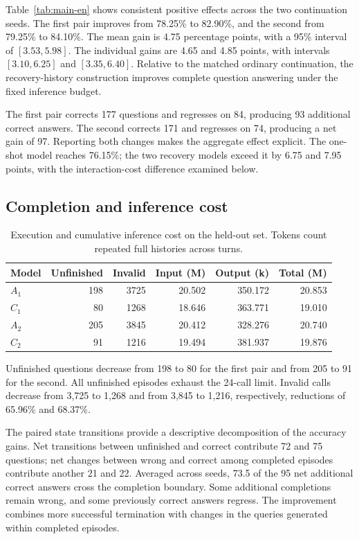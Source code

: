\documentclass[runningheads]{llncs}
\begin{document}
Table~\ref{tab:main-en} shows consistent positive effects across the two continuation seeds. The first pair improves from 78.25\% to 82.90\%, and the second from 79.25\% to 84.10\%. The mean gain is 4.75 percentage points, with a 95\% interval of $[3.53,5.98]$. The individual gains are 4.65 and 4.85 points, with intervals $[3.10,6.25]$ and $[3.35,6.40]$. Relative to the matched ordinary continuation, the recovery-history construction improves complete question answering under the fixed inference budget.

The first pair corrects 177 questions and regresses on 84, producing 93 additional correct answers. The second corrects 171 and regresses on 74, producing a net gain of 97. Reporting both changes makes the aggregate effect explicit. The one-shot model reaches 76.15\%; the two recovery models exceed it by 6.75 and 7.95 points, with the interaction-cost difference examined below.

\subsection{Completion and inference cost}

\begin{table}[htbp]
 \centering
 \caption{Execution and cumulative inference cost on the held-out set. Tokens count repeated full histories across turns.}
 \label{tab:cost-en}
 \begin{tabular}{@{}lrrrrr@{}}
\toprule
Model & Unfinished & Invalid & Input (M) & Output (k) & Total (M) \\
\midrule
$A_{1}$ & 198 & 3725 & 20.502 & 350.172 & 20.853 \\
$C_{1}$ & 80 & 1268 & 18.646 & 363.771 & 19.010 \\
$A_{2}$ & 205 & 3845 & 20.412 & 328.276 & 20.740 \\
$C_{2}$ & 91 & 1216 & 19.494 & 381.937 & 19.876 \\
\bottomrule
\end{tabular}
\end{table}

Unfinished questions decrease from 198 to 80 for the first pair and from 205 to 91 for the second. All unfinished episodes exhaust the 24-call limit. Invalid calls decrease from 3,725 to 1,268 and from 3,845 to 1,216, respectively, reductions of 65.96\% and 68.37\%.

The paired state transitions provide a descriptive decomposition of the accuracy gains. Net transitions between unfinished and correct contribute 72 and 75 questions; net changes between wrong and correct among completed episodes contribute another 21 and 22. Averaged across seeds, 73.5 of the 95 net additional correct answers cross the completion boundary. Some additional completions remain wrong, and some previously correct answers regress. The improvement combines more successful termination with changes in the queries generated within completed episodes.
\end{document}
